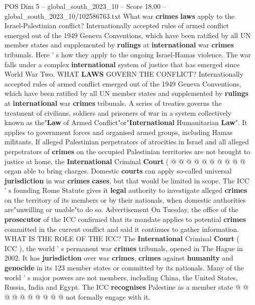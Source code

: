 \begin{textsample}{POS Dim 5 – global\_south\_2023\_10 – Score 18.00 – global\_south\_2023\_10/102586763.txt}  \label{ex:f5_pos_361}
What war \textbf{crimes} \textbf{laws} apply to the Israel-Palestinian conflict?
Internationally accepted rules of armed conflict emerged out of the 1949 Geneva Conventions, which have been ratified by all UN member states and supplemented by \textbf{rulings} at \textbf{international} war \textbf{crimes} tribunals.
Here ' s how they apply to the ongoing Israel-Hamas violence.
The war falls under a complex \textbf{international} system of justice that has emerged since World War Two.
WHAT \textbf{LAWS} GOVERN THE CONFLICT?
Internationally accepted rules of armed conflict emerged out of the 1949 Geneva Conventions, which have been ratified by all UN member states and supplemented by \textbf{rulings} at \textbf{international} war \textbf{crimes} tribunals.
A series of treaties governs the treatment of civilians, soldiers and prisoners of war in a system collectively known as the"\textbf{Law} of Armed Conflict"or"\textbf{International} Humanitarian \textbf{Law}".
It applies to government forces and organised armed groups, including Hamas militants.
If alleged Palestinian perpetrators of atrocities in Israel and all alleged perpetrators of \textbf{crimes} on the occupied Palestinian territories are not brought to justice at home, the \textbf{International} Criminal \textbf{Court} ( @ @ @ @ @ @ @ @ @ @ organ able to bring charges.
Domestic \textbf{courts} can apply so-called universal \textbf{jurisdiction} in war \textbf{crimes} \textbf{cases}, but that would be limited in scope.
The ICC ' s founding Rome Statute gives it \textbf{legal} authority to investigate alleged \textbf{crimes} on the territory of its members or by their nationals, when domestic authorities are"unwilling or unable"to do so.
Advertisement On Tuesday, the office of the \textbf{prosecutor} of the ICC confirmed that its mandate applies to potential \textbf{crimes} committed in the current conflict and said it continues to gather information.
WHAT IS THE ROLE OF THE ICC?
The \textbf{International} Criminal \textbf{Court} ( ICC ), the world ' s permanent war \textbf{crimes} tribunals, opened in The Hague in 2002.
It has \textbf{jurisdiction} over war \textbf{crimes}, \textbf{crimes} against \textbf{humanity} and \textbf{genocide} in its 123 member states or committed by its nationals.
Many of the world ' s major powers are not members, including China, the United States, Russia, India and Egypt.
The ICC \textbf{recognises} Palestine as a member state @ @ @ @ @ @ @ @ @ @ not formally engage with it.

\end{textsample}
